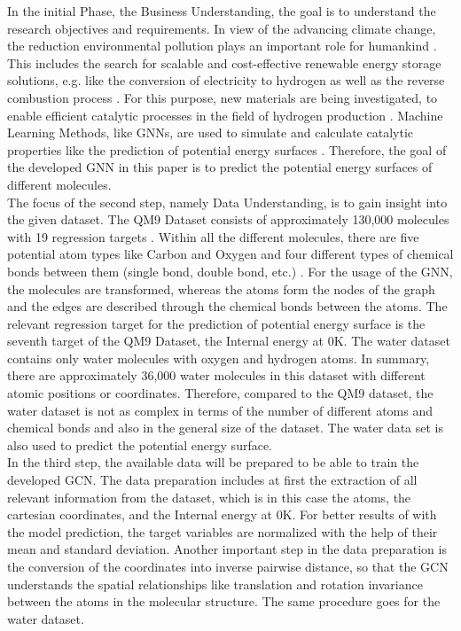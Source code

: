 In the initial Phase, the Business Understanding, the goal is to understand the research objectives and requirements. In view of the advancing climate change, the reduction environmental pollution plays an important role for humankind \cite{amin_hydrogen_2022}. This includes the search for scalable and cost-effective renewable energy storage solutions, e.g. like the conversion of electricity to hydrogen as well as the reverse combustion process \cite{kilkis_research_2019}. For this purpose, new materials are being investigated, to enable efficient catalytic processes in the field of hydrogen production \cite{chen_waste-derived_2023}. Machine Learning Methods, like GNNs, are used to simulate and calculate catalytic properties like the prediction of potential energy surfaces \cite{tran_open_2023}. Therefore, the goal of the developed GNN in this paper is to predict the potential energy surfaces of different molecules. \\

The focus of the second step, namely Data Understanding, is to gain insight into the given dataset. The QM9 Dataset consists of approximately 130,000 molecules with 19 regression targets \cite{noauthor_torch_geometricdatasetsqm9_nodate}. 
Within all the different molecules, there are five potential atom types like Carbon and Oxygen and four different types of chemical bonds between them (single bond, double bond, etc.) \cite{menonunderstanding}. For the usage of the GNN, the molecules are transformed, whereas the atoms form the nodes of the graph and the edges are described through the chemical bonds between the atoms. The relevant regression target for the prediction of potential energy surface is the seventh target of the QM9 Dataset, the Internal energy at 0K. The water dataset contains only water molecules with oxygen and hydrogen atoms. In summary, there are approximately 36,000 water molecules in this dataset with different atomic positions or coordinates. Therefore, compared to the QM9 dataset, the water dataset is not as complex in terms of the number of different atoms and chemical bonds and also in the general size of the dataset. The water data set is also used to predict the potential energy surface. \\

In the third step, the available data will be prepared to be able to train the developed GCN. The data preparation includes at first the extraction of all relevant information from the dataset, which is in this case the atoms, the cartesian coordinates, and the Internal energy at 0K. For better results of with the model prediction, the target variables are normalized with the help of their mean and standard deviation. Another important step in the data preparation is the conversion of the coordinates into inverse pairwise distance, so that the GCN understands the spatial relationships like translation and rotation invariance between the atoms in the molecular structure. The same procedure goes for the water dataset.\\

